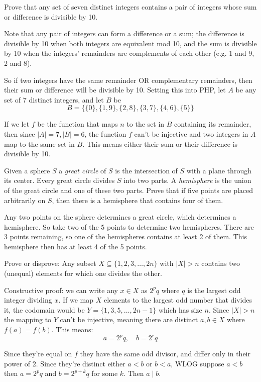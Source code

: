 \documentclass{article}
\begin{document}
\begin{problem}
Prove that any set of seven distinct integers contains a pair of integers whose sum or difference is divisible by 10.
\end{problem}

Note that any pair of integers can form a difference or a sum; the difference is divisible by 10 when both integers are equivalent mod 10, and the sum is divisible by 10 when the integers' remainders are complements of each other (e.g. 1 and 9, 2 and 8).

So if two integers have the same remainder OR complementary remainders, then their sum or difference will be divisible by 10. Setting this into PHP, let $A$ be any set of 7 distinct integers, and let $B$ be
$$B = \{\{0\}, \{1, 9\}, \{2, 8\}, \{3, 7\}, \{4, 6\}, \{5\}\}$$

If we let $f$ be the function that maps $n$ to the set in $B$ containing its remainder, then since $|A| = 7, |B| = 6$, the function $f$ can't be injective and two integers in $A$ map to the same set in $B$. This means either their sum or their difference is divisible by 10.

\begin{problem}
Given a sphere $S$ a \textit{great circle} of $S$ is the intersection of $S$ with a plane through its center. Every great circle divides $S$ into two parts. A \textit{hemisphere} is the union of the great circle and one of these two parts. Prove that if five points are placed arbitrarily on $S$, then there is a hemisphere that contains four of them.
\end{problem}


Any two points on the sphere determines a great circle, which determines a hemisphere. So take two of the 5 points to determine two hemispheres. There are 3 points remaining, so one of the hemispheres contains at least 2 of them. This hemisphere then has at least 4 of the 5 points.

\begin{problem}
Prove or disprove: Any subset $X \subseteq \{1, 2, 3, \ldots, 2n\}$ with $|X| > n$ contains two (unequal) elements for which one divides the other.
\end{problem}

Constructive proof: we can write any $x \in X$ as $2^p q$ where $q$ is the largest odd integer dividing $x$. If we map $X$ elements to the largest odd number that divides it, the codomain would be $Y = \{1, 3, 5, \ldots, 2n - 1\}$ which has size $n$. Since $|X| > n$ the mapping to $Y$ can't be injective, meaning there are distinct $a, b \in X$ where $f(a) = f(b)$. This means:
$$a = 2^p q, \quad b = 2^r q$$

Since they're equal on $f$ they have the same odd divisor, and differ only in their power of 2. Since they're distinct either $a < b$ or $b < a$, WLOG suppose $a < b$ then $a = 2^p q$ and $b = 2^{p+k}q$ for some $k$. Then $a \mid b$.
\end{document}
